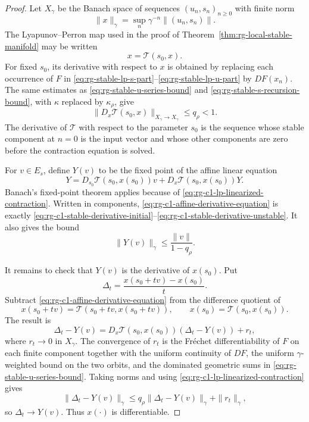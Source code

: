 \begin{proof}
Let \(X_\gamma\) be the Banach space of sequences
\((u_n,s_n)_{n\geq0}\) with finite norm
\[
  \|x\|_\gamma
  =
  \sup_n\gamma^{-n}\|(u_n,s_n)\|.
\]
The
Lyapunov--Perron map used in the proof of
Theorem~\ref{thm:rg-local-stable-manifold} may be written
\[
  x=\mathcal T(s_0,x).
\]
For fixed \(s_0\), its derivative with respect to \(x\) is obtained by
replacing each occurrence of \(F\) in
\eqref{eq:rg-stable-lp-s-part}--\eqref{eq:rg-stable-lp-u-part} by
\(DF(x_n)\).  The same estimates as
\eqref{eq:rg-stable-u-series-bound} and
\eqref{eq:rg-stable-s-recursion-bound}, with \(\kappa\) replaced by
\(\kappa_\rho\), give
\begin{equation}
  \|D_x\mathcal T(s_0,x)\|_{X_\gamma\to X_\gamma}
  \leq q_\rho<1 .
  \label{eq:rg-c1-lp-linearized-contraction}
\end{equation}
The derivative of \(\mathcal T\) with respect to the parameter \(s_0\) is the
sequence whose stable component at \(n=0\) is the input vector and whose
other components are zero before the contraction equation is solved.

For \(v\in E_s\), define \(Y(v)\) to be the fixed point of the affine
linear equation
\begin{equation}
  Y
  =
  D_{s_0}\mathcal T(s_0,x(s_0))v
  +
  D_x\mathcal T(s_0,x(s_0))Y .
  \label{eq:rg-c1-affine-derivative-equation}
\end{equation}
Banach's fixed-point theorem applies because of
\eqref{eq:rg-c1-lp-linearized-contraction}.  Written in components,
\eqref{eq:rg-c1-affine-derivative-equation} is exactly
\eqref{eq:rg-c1-stable-derivative-initial}--\eqref{eq:rg-c1-stable-derivative-unstable}.
It also gives the bound
\[
  \|Y(v)\|_\gamma\leq\frac{\|v\|}{1-q_\rho}.
\]

It remains to check that \(Y(v)\) is the derivative of \(x(s_0)\).  Put
\[
  \Delta_t=\frac{x(s_0+tv)-x(s_0)}{t}.
\]
Subtract
\eqref{eq:rg-c1-affine-derivative-equation} from the difference quotient of
\[
  x(s_0+tv)=\mathcal T(s_0+tv,x(s_0+tv)),
  \qquad
  x(s_0)=\mathcal T(s_0,x(s_0)).
\]
The result is
\[
  \Delta_t-Y(v)
  =
  D_x\mathcal T(s_0,x(s_0))(\Delta_t-Y(v))
  +
  r_t,
\]
where \(r_t\to0\) in \(X_\gamma\).  The convergence of \(r_t\) is the
Fréchet differentiability of \(F\) on each finite component together with
the uniform continuity of \(DF\), the uniform \(\gamma\)-weighted bound on
the two orbits, and the dominated geometric sums in
\eqref{eq:rg-stable-u-series-bound}.  Taking norms and using
\eqref{eq:rg-c1-lp-linearized-contraction} gives
\[
  \|\Delta_t-Y(v)\|_\gamma
  \leq
  q_\rho\|\Delta_t-Y(v)\|_\gamma+\|r_t\|_\gamma ,
\]
so \(\Delta_t\to Y(v)\).  Thus \(x(\cdot)\) is differentiable.


\end{proof}
